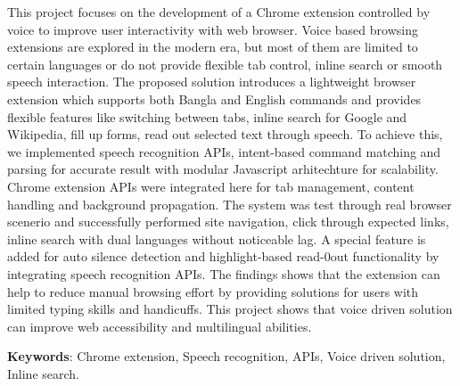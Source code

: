 
		This project focuses on the development of a Chrome extension controlled by voice to improve user interactivity with web browser. Voice based browsing extensions are explored in the modern era, but most of them are limited to certain languages or do not provide flexible tab control, inline search or smooth speech interaction. The proposed solution introduces a lightweight browser extension which supports both Bangla and English commands and provides flexible features like switching between tabs, inline search for Google and Wikipedia, fill up forms, read out selected text through speech. To achieve this, we implemented speech recognition APIs, intent-based command matching and parsing for accurate result with modular Javascript arhitechture for scalability. Chrome extension APIs were integrated here for tab management, content handling and background propagation. The system was test through real browser scenerio and successfully performed site navigation, click through expected links, inline search with dual languages without noticeable lag. A special feature is added for auto silence detection and highlight-based read-0out functionality by integrating speech recognition APIs. The findings shows that the extension can help to reduce manual browsing effort by providing solutions for users with limited typing skills and handicuffs. This project shows that voice driven solution can improve web accessibility and multilingual abilities.
		
		\vspace{8pt}
		\textbf{Keywords}: Chrome extension, Speech recognition, APIs, Voice driven solution, Inline search.

	







































